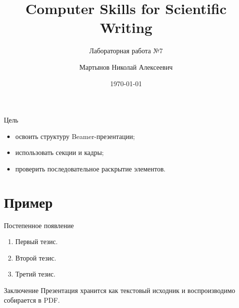 \documentclass[aspectratio=169]{beamer}
\title{Computer Skills for Scientific Writing}
\subtitle{Лабораторная работа №7}
\author{Мартынов Николай Алексеевич}
\date{\today}
\begin{document}
\begin{frame}
  \titlepage
\end{frame}

\begin{frame}{Цель}
  \begin{itemize}
    \item освоить структуру Beamer-презентации;
    \item использовать секции и кадры;
    \item проверить последовательное раскрытие элементов.
  \end{itemize}
\end{frame}

\section{Пример}
\begin{frame}{Постепенное появление}
  \begin{enumerate}[<+->]
    \item Первый тезис.
    \item Второй тезис.
    \item Третий тезис.
  \end{enumerate}
\end{frame}

\begin{frame}{Заключение}
  Презентация хранится как текстовый исходник и воспроизводимо собирается в PDF.
\end{frame}
\end{document}
